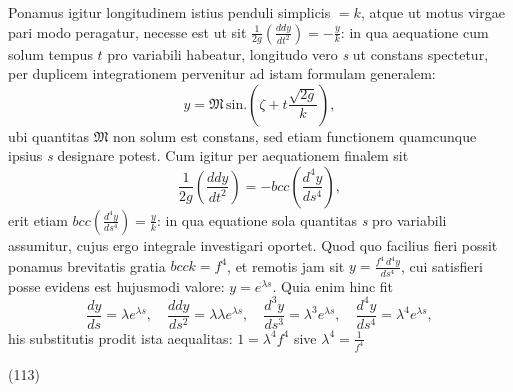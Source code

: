 \documentclass[11pt,a4paper]{article}
\begin{document}
Ponamus igitur longitudinem istius penduli simplicis $= k$, atque ut motus
virgae pari modo peragatur, necesse est ut sit
$\frac{1}{2g}\left(\frac{ddy}{dt^2}\right) = -\frac{y}{k}$: in qua aequatione
cum solum tempus $t$ pro variabili habeatur, longitudo vero \emph{s} ut
constans spectetur, per duplicem integrationem pervenitur ad istam formulam
generalem:
\[
y = \mathfrak{M}\,\text{sin.}\left(\zeta + t\frac{\sqrt{2g}}{k}\right),
\]
ubi quantitas $\mathfrak{M}$ non solum est constans, sed etiam functionem
quamcunque ipsius \emph{s} designare potest. Cum igitur per aequationem
finalem sit
\[
\frac{1}{2g}\left(\frac{ddy}{dt^2}\right) = -bcc\left(\frac{d^4y}{ds^4}\right),
\]
erit etiam $bcc\left(\frac{d^4y}{ds^4}\right) = \frac{y}{k}$: in qua equatione
sola quantitas \emph{s} pro variabili assumitur, cujus ergo integrale
investigari oportet. Quod quo facilius fieri possit ponamus brevitatis gratia
$bcck = f^4$, et remotis  jam sit $y = \frac{f^4\,d^4y}{ds^4}$, cui
satisfieri posse evidens est hujusmodi valore: $y = e^{\lambda s}$. Quia enim
hinc fit
\[
\frac{dy}{ds} = \lambda e^{\lambda s}, \quad
\frac{ddy}{ds^2} = \lambda\lambda e^{\lambda s}, \quad
\frac{d^3y}{ds^3} = \lambda^3 e^{\lambda s}, \quad
\frac{d^4y}{ds^4} = \lambda^4 e^{\lambda s},
\]
his substitutis prodit ista aequalitas: $1 = \lambda^4 f^4$ sive
$\lambda^4 = \frac{1}{f^4}$

(113)
\end{document}
